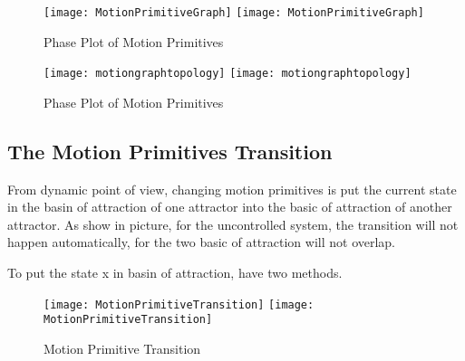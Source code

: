 \begin{figure}[!htbp]
  \begin{center}
    \leavevmode
    \ifpdf
      \texttt{[image: MotionPrimitiveGraph]}
    \else
      \texttt{[image: MotionPrimitiveGraph]}
    \fi
    \caption{Phase Plot of Motion Primitives}
    \label{fig:manyprimitives}
  \end{center}
\end{figure}


\begin{figure}[!htbp]
  \begin{center}
    \leavevmode
    \ifpdf
      \texttt{[image: motiongraphtopology]}
    \else
      \texttt{[image: motiongraphtopology]}
    \fi
    \caption{Phase Plot of Motion Primitives}
    \label{fig:manyprimitives}
  \end{center}
\end{figure}


\subsection{The Motion Primitives Transition}

From dynamic point of view, changing motion primitives is put the current state in the basin of attraction  of one attractor into the basic of attraction of another attractor.
As show in picture, for the uncontrolled system, the transition will not happen automatically, for the two basic of attraction will not overlap.

To put the state x in basin of attraction, have two methods.


\begin{figure}[!htbp]
  \begin{center}
    \leavevmode
    \ifpdf
      \texttt{[image: MotionPrimitiveTransition]}
    \else
      \texttt{[image: MotionPrimitiveTransition]}
    \fi
    \caption{Motion Primitive Transition}
    \label{fig:motion-transition}
  \end{center}
\end{figure}

